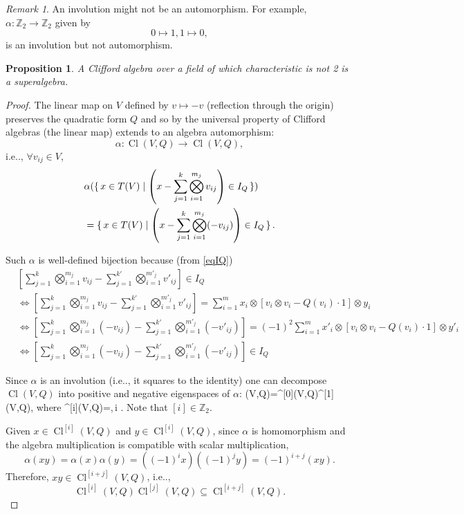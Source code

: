 \documentclass[12pt, letterpaper]{article}
\makeatletter
\newcommand{\inte}{\mathbb{Z}}
\newcommand{\Cl}{\operatorname{Cl}}
\newcommand\ie{i.e\@ifnextchar.{}{.\@}}
\newcommand{\red}[1]{{\color{red} #1}}
\newenvironment{eqlong}{\equation\aligned}{\endaligned\endequation}
\newtheorem{prop}{Proposition}[section]
\theoremstyle{definition}
\theoremstyle{remark}
\newtheorem*{rem*}{Remark}
\theoremstyle{definition}
\theoremstyle{plain}
\numberwithin{equation}{section}
\makeatother
\begin{document}
	\begin{rem*}
		An involution might not be an automorphism. For example, $\alpha \colon \inte_2 \to \inte_2$
		given by
		\[0\mapsto 1, 1\mapsto 0,\]
		is an involution but not automorphism.
	\end{rem*}

	\begin{prop}
		A Clifford algebra over a field of which characteristic is not 2 is a superalgebra.
	\end{prop}
	\begin{proof}
		The linear map on $V$ defined by $v \mapsto -v$ (reflection through the origin)
		preserves the quadratic form $Q$ and so by the \red{universal property} of Clifford algebras
		(the linear map) extends to an algebra automorphism:
		\[\alpha :\Cl (V,Q)\to \Cl (V,Q),\]
		\ie, $\forall v_{ij}\in V$,
		\[
		\begin{aligned}
			&\alpha(\set{x\in T(V)| \left(x - \sum_{j=1}^{k} \bigotimes_{i=1}^{m_j} v_{ij}\right) \in I_Q}) \\
			&=
			\set{x\in T(V)| \left(x - \sum_{j=1}^{k} \bigotimes_{i=1}^{m_j} (-v_{ij})\right) \in I_Q}.\\
		\end{aligned}
		\]
		
		Such $\alpha$ is well-defined bijection because (from \eqref{eqIQ})
		\[
		\begin{aligned}
			&\left[\sum_{j=1}^{k} \bigotimes_{i=1}^{m_j} v_{ij} - \sum_{j=1}^{k'} \bigotimes_{i=1}^{m'_j} v'_{ij}\right]\in I_Q\\
			&\iff \left[\sum_{j=1}^{k} \bigotimes_{i=1}^{m_j} v_{ij} - \sum_{j=1}^{k'} \bigotimes_{i=1}^{m'_j} v'_{ij}\right]
			=\sum_{i=1}^{m}x_i\otimes\left[v_i\otimes v_i-Q(v_i)\cdot 1\right]\otimes y_i\\
			&\iff \left[\sum_{j=1}^{k} \bigotimes_{i=1}^{m_j} (-v_{ij}) - \sum_{j=1}^{k'} \bigotimes_{i=1}^{m'_j} (-v'_{ij})\right]
			=(-1)^2\sum_{i=1}^{m}x'_i\otimes\left[v_i\otimes v_i-Q(v_i)\cdot 1\right]\otimes y'_i\\
			&\iff \left[\sum_{j=1}^{k} \bigotimes_{i=1}^{m_j} (-v_{ij}) - \sum_{j=1}^{k'} \bigotimes_{i=1}^{m'_j} (-v'_{ij})\right]\in I_Q
		\end{aligned}\]
	
		Since $\alpha$ is an involution (\ie, it squares to the identity) one can decompose $\Cl(V, Q)$
		into positive and negative eigenspaces of $\alpha$:
		\begin{eqlong}
			\Cl(V,Q)=\Cl^{[0]}(V,Q)\oplus \Cl^{[1]}(V,Q),
		\end{eqlong}
		where
		\begin{eqlong}
			\Cl^{[i]}(V,Q)=\set{x\in \Cl(V,Q)|\alpha(x)=(-1)^{i}x},\,\forall i \in \inte.
		\end{eqlong}
		Note that $[i]\in \inte_2$.
		
		Given $x\in\Cl^{[i]}(V,Q)$ and $y\in\Cl^{[i]}(V,Q)$,
		since $\alpha$ is homomorphism and the algebra multiplication is compatible with scalar multiplication,
		\[\alpha(xy)=\alpha(x)\alpha(y)=((-1)^{i}x)((-1)^jy)=(-1)^{i+j}(xy). \]
		Therefore, $xy\in\Cl^{[i+j]}(V,Q)$, \ie,
		\[\Cl^{[i]}(V,Q)\Cl^{[j]}(V,Q)\subseteq \Cl^{[i+j]}(V,Q).\]
	\end{proof}
\end{document}
